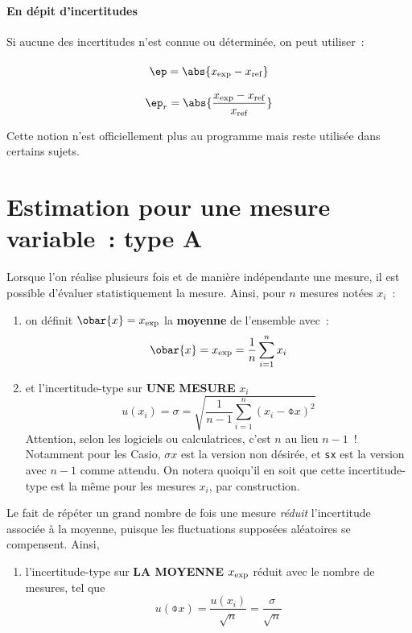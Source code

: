 \documentclass[../main/main.tex]{subfiles}
\begin{document}
\paragraph*{En dépit d'incertitudes}
Si aucune des incertitudes n'est connue ou déterminée, on peut utiliser~:
\begin{tcolorbox}[blankest]
	\begin{isd}
		\[
			\ep = \abs{x_{\rm exp} - x_{\rm ref}}
			\vphantom{\abs{\frac{x_{\rm exp} - x_{\rm ref}}{x_{\rm ref}}}}
		\]
		\tcblower
		\[
			\ep_r = \abs{\frac{x_{\rm exp} - x_{\rm ref}}{x_{\rm ref}}}
		\]
	\end{isd}
\end{tcolorbox}

Cette notion n'est officiellement plus au programme mais reste utilisée dans
certains sujets.

\section{Estimation pour une mesure variable~: type A}

Lorsque l'on réalise plusieurs fois et de manière indépendante une mesure, il
est possible d'évaluer statistiquement la mesure. Ainsi, pour $n$ mesures notées
$x_i$~:
\begin{enumerate}
	\item on définit $\obar{x} = x_{\rm exp}$ la \textbf{moyenne} de
	      l'ensemble avec~:
	      \[
		      \obar{x} = x_{\rm exp} = \frac{1}{n} \sum_{i=1}^{n} x_i
	      \]
	\item et l'incertitude-type sur \textbf{UNE MESURE} $x_i$
	      \[
		      u(x_i) = \sigma =
		      \sqrt{\frac{1}{n-1} \sum_{i=1}^{n} (x_i - \obar{x})^{2}}
	      \]
	      Attention, selon les logiciels ou calculatrices, c'est $n$ au lieu $n-1$~!
	      Notamment pour les Casio, \texttt{$\sigma x$} est la version non désirée, et
	      \texttt{sx} est la version avec $n-1$ comme attendu. On notera quoiqu'il en soit
	      que cette incertitude-type est la même pour  les mesures $x_i$, par
	      construction.
\end{enumerate}
Le fait de répéter un grand nombre de fois une mesure \textit{réduit}
l'incertitude associée à la moyenne, puisque les fluctuations supposées
aléatoires se compensent. Ainsi,
\begin{enumerate}[resume]
	\item l'incertitude-type sur \textbf{LA MOYENNE} $x_{\rm exp}$ réduit avec le
	      nombre de mesures, tel que
	      \[
		      u(\obar{x}) = \frac{u(x_i)}{\sqrt{n}} = \frac{\sigma}{\sqrt{n}}
	      \]
\end{enumerate}
\end{document}
